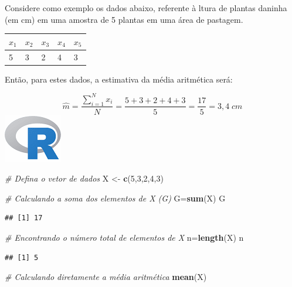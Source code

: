 \documentclass[
]{article}
\newenvironment{Shaded}{\begin{snugshade}}{\end{snugshade}}
\newcommand{\CommentTok}[1]{\textcolor[rgb]{0.56,0.35,0.01}{\textit{#1}}}
\newcommand{\DecValTok}[1]{\textcolor[rgb]{0.00,0.00,0.81}{#1}}
\newcommand{\KeywordTok}[1]{\textcolor[rgb]{0.13,0.29,0.53}{\textbf{#1}}}
\newcommand{\NormalTok}[1]{#1}
\newcommand{\StringTok}[1]{\textcolor[rgb]{0.31,0.60,0.02}{#1}}
\begin{document}
Considere como exemplo os dados abaixo, referente à ltura de plantas
daninha (em cm) em uma amostra de 5 plantas em uma área de pastagem.

\begin{longtable}[]{@{}lllll@{}}
\toprule
\(x_1\) & \(x_2\) & \(x_3\) & \(x_4\) & \(x_5\)\tabularnewline
\midrule
\endhead
5 & 3 & 2 & 4 & 3\tabularnewline
\bottomrule
\end{longtable}

Então, para estes dados, a estimativa da média aritmética será:

\[
\hat{m} = \frac{\sum_{i=1}^{N}x_i}{N} = \frac{5+3+2+4+3}{5} = \frac{17}{5} = 3,4\;cm
\] \includegraphics{R.png}

\begin{Shaded}
\begin{Highlighting}[]
\CommentTok{# Defina o vetor de dados}
\NormalTok{X <-}\StringTok{ }\KeywordTok{c}\NormalTok{(}\DecValTok{5}\NormalTok{,}\DecValTok{3}\NormalTok{,}\DecValTok{2}\NormalTok{,}\DecValTok{4}\NormalTok{,}\DecValTok{3}\NormalTok{)}

\CommentTok{# Calculando a soma dos elementos de X (G)}
\NormalTok{G=}\KeywordTok{sum}\NormalTok{(X)}
\NormalTok{G}
\end{Highlighting}
\end{Shaded}

\begin{verbatim}
## [1] 17
\end{verbatim}

\begin{Shaded}
\begin{Highlighting}[]
\CommentTok{# Encontrando o número total de elementos de X}
\NormalTok{n=}\KeywordTok{length}\NormalTok{(X)}
\NormalTok{n}
\end{Highlighting}
\end{Shaded}

\begin{verbatim}
## [1] 5
\end{verbatim}

\begin{Shaded}
\begin{Highlighting}[]
\CommentTok{# Calculando diretamente a média aritmética}
\KeywordTok{mean}\NormalTok{(X)}
\end{Highlighting}
\end{Shaded}
\end{document}
